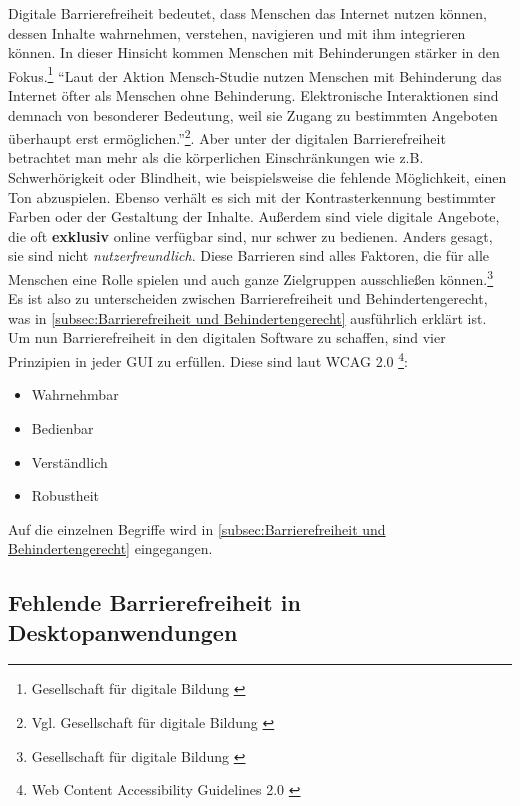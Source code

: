 Digitale Barrierefreiheit bedeutet, dass Menschen das Internet nutzen können, dessen Inhalte wahrnehmen, verstehen, navigieren und mit ihm integrieren können. In dieser Hinsicht kommen Menschen mit Behinderungen stärker in den Fokus.\footnote{Gesellschaft für digitale Bildung \cite{GFDB}} "`Laut der Aktion Mensch-Studie nutzen Menschen mit Behinderung das Internet öfter als Menschen ohne Behinderung. Elektronische Interaktionen sind demnach von besonderer Bedeutung, weil sie Zugang zu bestimmten Angeboten überhaupt erst ermöglichen."'\footnote{Vgl. Gesellschaft für digitale Bildung \cite{GFDB}}. Aber unter der digitalen Barrierefreiheit betrachtet man mehr als die körperlichen Einschränkungen wie z.B. Schwerhörigkeit oder Blindheit, wie beispielsweise die fehlende Möglichkeit, einen Ton abzuspielen. Ebenso verhält es sich mit der Kontrasterkennung bestimmter Farben oder der Gestaltung der Inhalte. Außerdem sind viele digitale Angebote, die oft \textbf{exklusiv} online verfügbar sind, nur schwer zu bedienen. Anders gesagt, sie sind nicht \textit{nutzerfreundlich}. Diese Barrieren sind alles Faktoren, die für alle Menschen eine Rolle spielen und auch ganze Zielgruppen ausschließen können.\footnote{Gesellschaft für digitale Bildung \cite{GFDB}} Es ist also zu unterscheiden zwischen Barrierefreiheit und Behindertengerecht, was in \cref{subsec:Barrierefreiheit und Behindertengerecht} ausführlich erklärt ist. Um nun Barrierefreiheit in den digitalen Software zu schaffen, sind vier Prinzipien in jeder \ac{GUI} zu erfüllen. Diese sind laut \ac{WCAG} 2.0 \footnote{Web Content Accessibility Guidelines 2.0 \cite{caldwell2008web}}:

\begin{itemize}
	\item Wahrnehmbar
	\item Bedienbar
	\item Verständlich
	\item Robustheit
\end{itemize}

Auf die einzelnen Begriffe wird in \cref{subsec:Barrierefreiheit und Behindertengerecht} eingegangen.

\subsection{Fehlende Barrierefreiheit in Desktopanwendungen}

